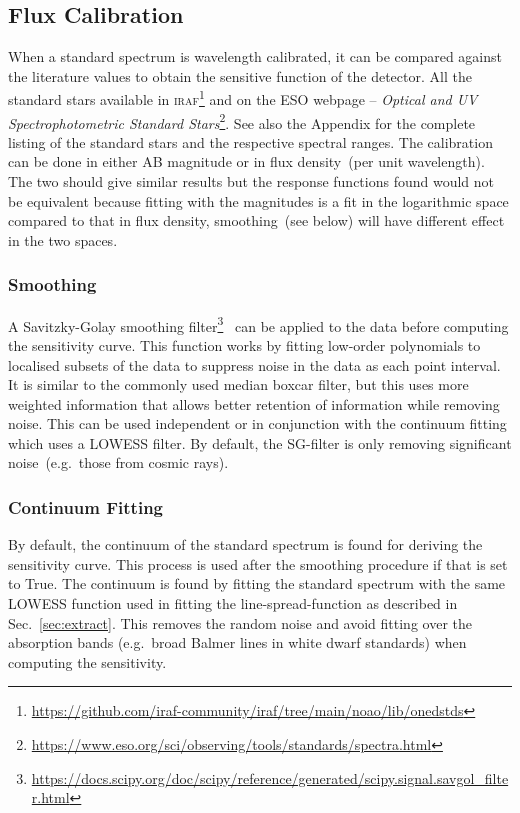 \documentclass[fleqn,usenatbib]{mnras}
\begin{document}
\subsection{Flux Calibration}
When a standard spectrum is wavelength calibrated, it can be
compared against the literature values to obtain the sensitive
function of the detector. All the standard stars available in
\textsc{iraf}\footnote{\url{https://github.com/iraf-community/iraf/tree/main/noao/lib/onedstds}}
and on the ESO webpage -- \textit{Optical and UV Spectrophotometric
Standard Stars}\footnote{\url{https://www.eso.org/sci/observing/tools/standards/spectra.html}}.
See also the Appendix for the complete listing of the standard
stars and the respective spectral ranges.
The calibration can be done in either AB magnitude or in
flux density~(per unit wavelength). The two should give similar
results but the response functions found would not be equivalent
because fitting with the magnitudes is a fit in the logarithmic
space compared to that in flux density, smoothing~(see below)
will have different effect in the two spaces.

\subsubsection*{Smoothing}
A Savitzky-Golay smoothing
filter\footnote{\url{https://docs.scipy.org/doc/scipy/reference/generated/scipy.signal.savgol_filter.html}}~\citep[hereafter, SG-filter]{1964AnaCh..36.1627S}
can be applied to the data before computing the sensitivity curve.
This function works by fitting low-order polynomials to localised
subsets of the data to suppress noise in the data as each point
interval. It is similar to the commonly used median boxcar filter,
but this uses more weighted information that allows better
retention of information while removing noise. This can be
used independent or in conjunction with the continuum fitting which
uses a LOWESS filter. By default, the SG-filter is only removing
significant noise~(e.g.\ those from cosmic rays).

\subsubsection*{Continuum Fitting}
By default, the continuum of the standard spectrum is found for
deriving the sensitivity curve. This process is used after the
smoothing procedure if that is set to True. The continuum is found
by fitting the standard spectrum with the same LOWESS function
used in fitting the line-spread-function as described in
Sec.~\ref{sec:extract}. This removes the random noise and avoid
fitting over the absorption bands (e.g.\ broad Balmer lines in
white dwarf standards) when computing the sensitivity.
\end{document}

